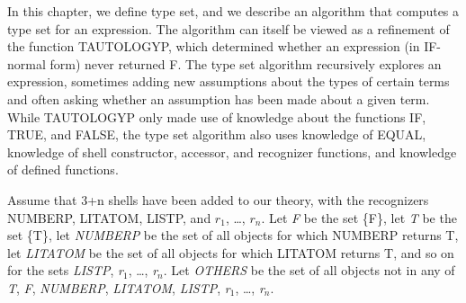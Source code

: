\documentclass[11pt]{book}
\newcommand{\pubinlineunderline}[1]{\emph{#1}}
\begin{document}
In this chapter, we define  type set, and we
describe an algorithm that computes a type set
for an expression.  The algorithm can itself be viewed as a 
refinement of the function TAUTOLOGYP, which determined whether
an expression (in IF-normal form) never returned
F.  The type set algorithm recursively explores
an expression, sometimes adding new assumptions
about the types of certain terms and often asking
whether an assumption has been made about a given term.
While TAUTOLOGYP only made use of knowledge about
the functions IF, TRUE, and FALSE, the type set
algorithm also uses knowledge of EQUAL,  knowledge of
shell constructor, accessor, and recognizer functions, and
knowledge of defined functions.

Assume that 3+n shells have been added to our
theory, with the recognizers NUMBERP, LITATOM,
LISTP, and $r_{1}$, \ldots{}, $r_{n}$.
Let \pubinlineunderline{F} be the set \{F\}, let \pubinlineunderline{T} be the
set \{T\}, let \pubinlineunderline{NUMBERP} be the set of all
objects for which NUMBERP returns T, let
\pubinlineunderline{LITATOM} be the set of all objects for which
LITATOM returns T, and so on for the sets \pubinlineunderline{LISTP},
\pubinlineunderline{r}$_{1}$, \ldots{}, \pubinlineunderline{r}$_{n}$.  Let \pubinlineunderline{OTHERS} be the
set of all objects not in any of \pubinlineunderline{T}, \pubinlineunderline{F}, \pubinlineunderline{NUMBERP},
\pubinlineunderline{LITATOM}, \pubinlineunderline{LISTP}, \pubinlineunderline{r}$_{1}$, \ldots{}, \pubinlineunderline{r}$_{n}$.
\end{document}
